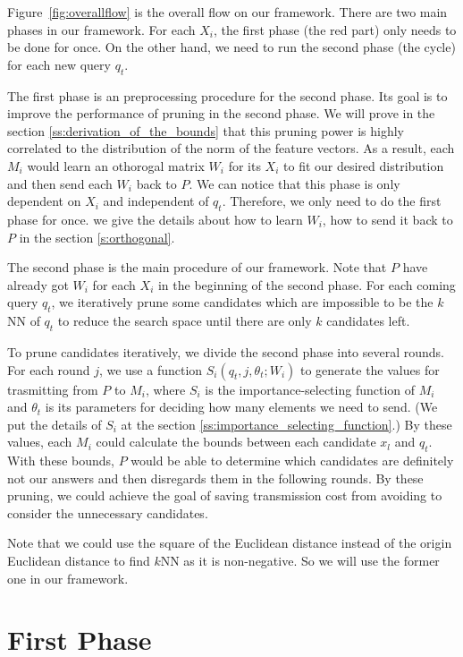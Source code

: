 Figure~\ref{fig:overallflow} is the overall flow on our framework.  There are two main phases in our framework.  For each $X_i$, the first phase (the red part) only needs to be done for once.  On the other hand, we need to run the second phase (the cycle) for each new query $q_t$.

The first phase is an preprocessing procedure for the second phase. Its goal is to improve the performance of pruning in the second phase.  We will prove in the section \ref{ss:derivation_of_the_bounds} that this pruning power is highly correlated to the distribution of the norm of the feature vectors. As a result, each $M_i$ would learn an othorogal matrix $W_i$ for its $X_i$ to fit our desired distribution and then send each $W_i$ back to $P$.  We can notice that this phase is only dependent on $X_i$ and independent of $q_t$.  Therefore, we only need to do the first phase for once.  we give the details about how to learn $W_i$, how to send it back to $P$ in the section \ref{s:orthogonal}.

The second phase is the main procedure of our framework.  Note that $P$ have already got $W_i$ for each $X_i$ in the beginning of the second phase. For each coming query $q_t$, we iteratively prune some candidates which are impossible to be the $k$NN of $q_t$ to reduce the search space until there are only $k$ candidates left.

To prune candidates iteratively, we divide the second phase into several rounds.  For each round $j$, we use a function $S_i(q_t,j,\theta_t;W_i)$ to generate the values for trasmitting from $P$ to $M_i$, where $S_i$ is the importance-selecting function of $M_i$ and $\theta_t$ is its parameters for deciding how many elements we need to send.  (We put the details of $S_i$ at the section \ref{ss:importance_selecting_function}.)  By these values, each $M_i$ could calculate the bounds between each candidate $x_l$ and $q_t$.  With these bounds, $P$ would be able to determine which candidates are definitely not our answers and then disregards them in the following rounds.  By these pruning, we could achieve the goal of saving transmission cost from avoiding to consider the unnecessary candidates.

Note that we could use the square of the Euclidean distance instead of the origin Euclidean distance to find $k$NN as it is non-negative.  So we will use the former one in our framework.

\section{First Phase}
\label{s:first_phase}

